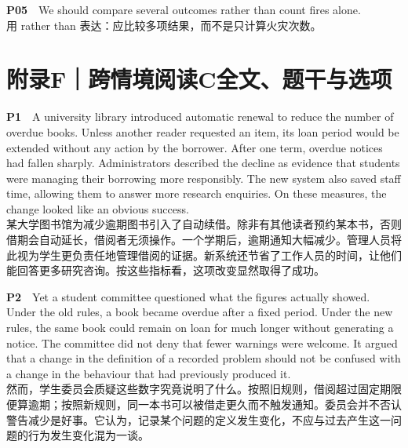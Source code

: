 \documentclass[a4paper,11pt,openany]{report}
\newcommand{\zhline}[1]{{\CJKsf\color{bodygrey}#1}}
\begin{document}
\begin{samepage}
\textbf{P05}　We should compare several outcomes rather than count fires alone.\\
\zhline{用 rather than 表达：应比较多项结果，而不是只计算火灾次数。}
\par\end{samepage}

\section{附录F｜跨情境阅读C全文、题干与选项}\label{ux9644ux5f55fux8de8ux60c5ux5883ux9605ux8bfbcux5168ux6587ux9898ux5e72ux4e0eux9009ux9879}

\begin{samepage}
\textbf{P1}　A university library introduced automatic renewal to reduce the number of overdue books. Unless another reader requested an item, its loan period would be extended without any action by the borrower. After one term, overdue notices had fallen sharply. Administrators described the decline as evidence that students were managing their borrowing more responsibly. The new system also saved staff time, allowing them to answer more research enquiries. On these measures, the change looked like an obvious success.\\
\zhline{某大学图书馆为减少逾期图书引入了自动续借。除非有其他读者预约某本书，否则借期会自动延长，借阅者无须操作。一个学期后，逾期通知大幅减少。管理人员将此视为学生更负责任地管理借阅的证据。新系统还节省了工作人员的时间，让他们能回答更多研究咨询。按这些指标看，这项改变显然取得了成功。}
\par\end{samepage}

\begin{samepage}
\textbf{P2}　Yet a student committee questioned what the figures actually showed. Under the old rules, a book became overdue after a fixed period. Under the new rules, the same book could remain on loan for much longer without generating a notice. The committee did not deny that fewer warnings were welcome. It argued that a change in the definition of a recorded problem should not be confused with a change in the behaviour that had previously produced it.\\
\zhline{然而，学生委员会质疑这些数字究竟说明了什么。按照旧规则，借阅超过固定期限便算逾期；按照新规则，同一本书可以被借走更久而不触发通知。委员会并不否认警告减少是好事。它认为，记录某个问题的定义发生变化，不应与过去产生这一问题的行为发生变化混为一谈。}
\par\end{samepage}
\end{document}
